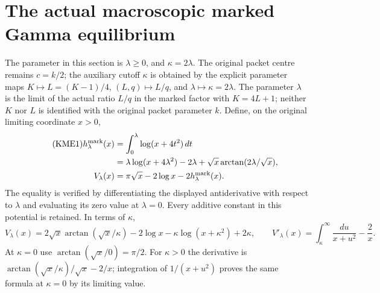 \documentclass[11pt,a4paper]{article}
\begin{document}

\clearpage

\section{The actual macroscopic marked Gamma equilibrium}
\label{sec:macroscopic-marked-equilibrium}

The parameter in this section is $\lambda\geq0$, and $\kappa=2\lambda$.
The original packet centre remains $c=k/2$; the auxiliary cutoff
$\kappa$ is obtained by the explicit parameter maps
$K\mapsto L=(K-1)/4$, $(L,q)\mapsto L/q$, and
$\lambda\mapsto\kappa=2\lambda$.
The parameter $\lambda$ is the limit of the actual ratio $L/q$ in the marked factor with
$K=4L+1$; neither $K$ nor $L$ is identified with the original packet
parameter $k$.  Define, on the original limiting coordinate $x>0$,
\begin{align}\tag{KME1}
 h_\lambda^{\rm mark}(x)
 &=\int_0^\lambda\log(x+4t^2)\,dt\\
 &=\lambda\log(x+4\lambda^2)-2\lambda
          +\sqrt x\arctan(2\lambda/\sqrt x),\notag\\
 V_\lambda(x)&=\pi\sqrt x-2\log x-2h_\lambda^{\rm mark}(x).
 \notag
\end{align}
The equality is verified by differentiating the displayed antiderivative
with respect to $\lambda$ and evaluating its zero value at $\lambda=0$.
Every additive constant in this potential is retained.  In terms of $\kappa$,
\begin{equation}\tag{KME2}
 V_\lambda(x)
 =2\sqrt x\arctan(\sqrt x/\kappa)-2\log x
                  -\kappa\log(x+\kappa^2)+2\kappa,
 \qquad
 V'_\lambda(x)=\int_\kappa^\infty\frac{du}{x+u^2}-\frac2x.
\end{equation}
At $\kappa=0$ use $\arctan(\sqrt x/0)=\pi/2$.
For $\kappa>0$ the derivative is
$\arctan(\sqrt x/\kappa)/\sqrt x-2/x$; integration of
$1/(x+u^2)$ proves the same formula at $\kappa=0$ by its limiting value.
\end{document}
